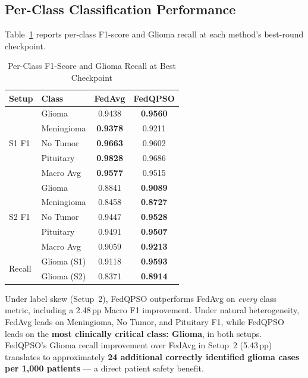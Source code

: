 \documentclass[conference]{IEEEtran}
\begin{document}
\subsection{Per-Class Classification Performance}

Table~\ref{tab:perclass} reports per-class F1-score and Glioma recall
at each method's best-round checkpoint.

\begin{table}[htbp]
\caption{Per-Class F1-Score and Glioma Recall at Best Checkpoint}
\label{tab:perclass}
\begin{center}
\renewcommand{\arraystretch}{1.15}
\begin{tabular}{llcc}
\hline
\textbf{Setup} & \textbf{Class} & \textbf{FedAvg} & \textbf{FedQPSO}\\
\hline
\multirow{5}{*}{S1 F1}
 & Glioma     & 0.9438 & \textbf{0.9560}\\
 & Meningioma & \textbf{0.9378} & 0.9211\\
 & No Tumor   & \textbf{0.9663} & 0.9602\\
 & Pituitary  & \textbf{0.9828} & 0.9686\\
 & Macro Avg  & \textbf{0.9577} & 0.9515\\
\hline
\multirow{5}{*}{S2 F1}
 & Glioma     & 0.8841 & \textbf{0.9089}\\
 & Meningioma & 0.8458 & \textbf{0.8727}\\
 & No Tumor   & 0.9447 & \textbf{0.9528}\\
 & Pituitary  & 0.9491 & \textbf{0.9507}\\
 & Macro Avg  & 0.9059 & \textbf{0.9213}\\
\hline
\multirow{2}{*}{Recall}
 & Glioma (S1) & 0.9118 & \textbf{0.9593}\\
 & Glioma (S2) & 0.8371 & \textbf{0.8914}\\
\hline
\end{tabular}
\end{center}
\end{table}

Under label skew (Setup~2), FedQPSO outperforms FedAvg on \emph{every}
class metric, including a 2.48\,pp Macro F1 improvement. Under natural
heterogeneity, FedAvg leads on Meningioma, No Tumor, and Pituitary F1,
while FedQPSO leads on the \textbf{most clinically critical class: Glioma},
in both setups. FedQPSO's Glioma recall improvement over FedAvg in
Setup~2 (5.43\,pp) translates to approximately \textbf{24 additional
correctly identified glioma cases per 1,000 patients} — a direct patient
safety benefit.
\end{document}
